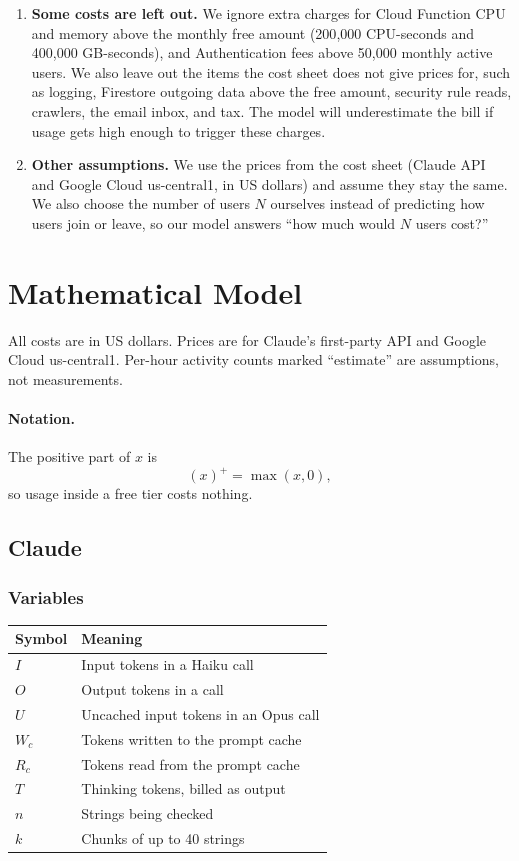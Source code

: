 \documentclass{article}
\newcommand{\pos}[1]{\left(#1\right)^{+}}
\begin{document}
\begin{enumerate}
    \item \textbf{Some costs are left out.}
    We ignore extra charges for Cloud Function CPU and memory above the monthly free amount (200{,}000 CPU-seconds and 400{,}000 GB-seconds), and Authentication fees above 50{,}000 monthly active users. We also leave out the items the cost sheet does not give prices for, such as logging, Firestore outgoing data above the free amount, security rule reads, crawlers, the email inbox, and tax. The model will underestimate the bill if usage gets high enough to trigger these charges.

    \item \textbf{Other assumptions.}
    We use the prices from the cost sheet (Claude API and Google Cloud us-central1, in US dollars) and assume they stay the same. We also choose the number of users $N$ ourselves instead of predicting how users join or leave, so our model answers ``how much would $N$ users cost?''
\end{enumerate}

\section{Mathematical Model}

All costs are in US dollars. Prices are for Claude's first-party API and
Google Cloud us-central1. Per-hour activity counts marked ``estimate'' are
assumptions, not measurements.

\paragraph{Notation.} The positive part of $x$ is
\[
\pos{x} = \max(x, 0),
\]
so usage inside a free tier costs nothing.

\subsection{Claude}

\subsubsection{Variables}

\begin{center}
\begin{tabular}{ll}
\toprule
Symbol & Meaning \\
\midrule
$I$ & Input tokens in a Haiku call \\
$O$ & Output tokens in a call \\
$U$ & Uncached input tokens in an Opus call \\
$W_c$ & Tokens written to the prompt cache \\
$R_c$ & Tokens read from the prompt cache \\
$T$ & Thinking tokens, billed as output \\
$n$ & Strings being checked \\
$k$ & Chunks of up to 40 strings \\
\bottomrule
\end{tabular}
\end{center}
\end{document}
